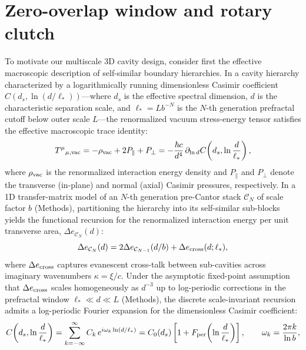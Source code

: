\documentclass[pdflatex,sn-nature]{sn-jnl}
\begin{document}
\section*{Zero-overlap window and rotary clutch}
\label{sec:architecture}

To motivate our multiscale 3D cavity design, consider first the effective macroscopic description of self-similar boundary hierarchies\cite{gordon2026prd}. In a cavity hierarchy characterized by a logarithmically running dimensionless Casimir coefficient $C(d_s, \ln(d/\ell_*))$---where $d_s$ is the effective spectral dimension, $d$ is the characteristic separation scale, and $\ell_* = L b^{-N}$ is the $N$-th generation prefractal cutoff below outer scale $L$---the renormalized vacuum stress-energy tensor satisfies the effective macroscopic trace identity\cite{gordon2026prd}:
\begin{equation}
T^\mu{}_{\mu,\rm vac} = -\rho_{\rm vac} + 2P_\parallel + P_\perp = -\frac{\hbar c}{d^4} \,\partial_{\ln d}C\!\left(d_s, \ln\frac{d}{\ell_*}\right),
\label{eq:trace_running}
\end{equation}
where $\rho_{\rm vac}$ is the renormalized interaction energy density and $P_\parallel$ and $P_\perp$ denote the transverse (in-plane) and normal (axial) Casimir pressures, respectively. In a 1D transfer-matrix model of an $N$-th generation pre-Cantor stack $\mathcal{C}_N$ of scale factor $b$ (Methods), partitioning the hierarchy into its self-similar sub-blocks yields the functional recursion for the renormalized interaction energy per unit transverse area, $\Delta e_{\mathcal{C}_N}(d)$:
\begin{equation}
\Delta e_{\mathcal{C}_N}(d) = 2 \Delta e_{\mathcal{C}_{N-1}}(d/b) + \Delta e_{\rm cross}(d; \ell_*),
\label{eq:recursion_main}
\end{equation}
where $\Delta e_{\rm cross}$ captures evanescent cross-talk between sub-cavities across imaginary wavenumbers $\kappa = \xi/c$. Under the asymptotic fixed-point assumption that $\Delta e_{\rm cross}$ scales homogeneously as $d^{-3}$ up to log-periodic corrections in the prefractal window $\ell_* \ll d \ll L$ (Methods), the discrete scale-invariant recursion admits a log-periodic Fourier expansion for the dimensionless Casimir coefficient:
\begin{equation}
C\!\left(d_s, \ln\frac{d}{\ell_*}\right) = \sum_{k=-\infty}^{\infty} C_k \, e^{i \omega_k \ln(d/\ell_*)} = C_0(d_s) \left[ 1 + F_{\rm per}\!\left(\ln\frac{d}{\ell_*}\right) \right], \qquad \omega_k = \frac{2\pi k}{\ln b},
\label{eq:fourier_running}
\end{equation}
\end{document}
